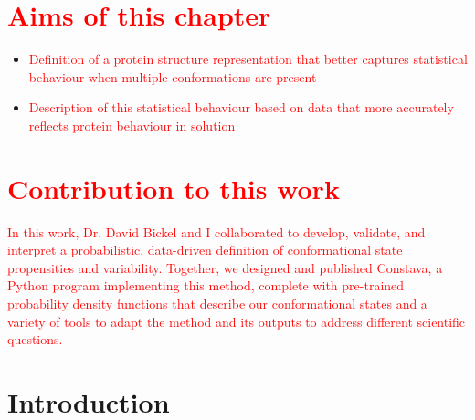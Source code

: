 \section*{\textcolor{red}{Aims of this chapter}}
\begin{itemize}
    \item \textcolor{red}{Definition of a protein structure representation that better captures statistical behaviour when multiple conformations are present}
    \item \textcolor{red}{Description of this statistical behaviour based on data that more accurately reflects protein behaviour in solution}
\end{itemize}

\section*{\textcolor{red}{Contribution to this work}}


\textcolor{red}{In this work, Dr. David Bickel and I collaborated to develop, validate, and interpret a probabilistic, data-driven definition of conformational state propensities and variability. Together, we designed and published Constava, a Python program implementing this method, complete with pre-trained probability density functions that describe our conformational states and a variety of tools to adapt the method and its outputs to address different scientific questions.}

\newpage

\section{Introduction}

